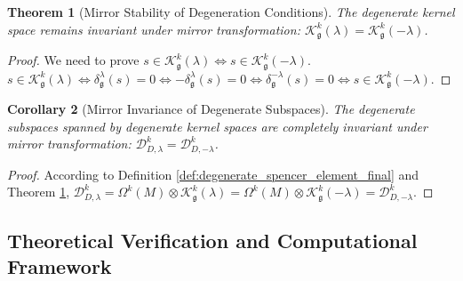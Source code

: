 \documentclass[a4paper,12pt]{extarticle}
\theoremstyle{plain}
\newtheorem{theorem}{Theorem}[section]
\newtheorem{corollary}[theorem]{Corollary}
\theoremstyle{definition}
\begin{document}
\begin{theorem}[Mirror Stability of Degeneration Conditions]
\label{thm:mirror-stability-compatible}
The degenerate kernel space remains invariant under mirror transformation: $\mathcal{K}^k_\mathfrak{g}(\lambda) = \mathcal{K}^k_\mathfrak{g}(-\lambda)$.
\end{theorem}
\begin{proof}
We need to prove $s \in \mathcal{K}^k_\mathfrak{g}(\lambda) \iff s \in \mathcal{K}^k_\mathfrak{g}(-\lambda)$.
$s \in \mathcal{K}^k_\mathfrak{g}(\lambda) \iff \delta^\lambda_\mathfrak{g}(s) = 0 \iff -\delta^\lambda_\mathfrak{g}(s) = 0 \iff \delta^{-\lambda}_\mathfrak{g}(s) = 0 \iff s \in \mathcal{K}^k_\mathfrak{g}(-\lambda)$.
\end{proof}

\begin{corollary}[Mirror Invariance of Degenerate Subspaces]
\label{cor:mirror-invariant-subspace}
The degenerate subspaces spanned by degenerate kernel spaces are completely invariant under mirror transformation: $\mathcal{D}^k_{D,\lambda} = \mathcal{D}^k_{D,-\lambda}$.
\end{corollary}
\begin{proof}
According to Definition \ref{def:degenerate_spencer_element_final} and Theorem \ref{thm:mirror-stability-compatible},
$\mathcal{D}^k_{D,\lambda} = \Omega^k(M) \otimes \mathcal{K}^k_\mathfrak{g}(\lambda) = \Omega^k(M) \otimes \mathcal{K}^k_\mathfrak{g}(-\lambda) = \mathcal{D}^k_{D,-\lambda}$.
\end{proof}

\subsection{Theoretical Verification and Computational Framework}
\label{sec:verification_framework}
\end{document}
